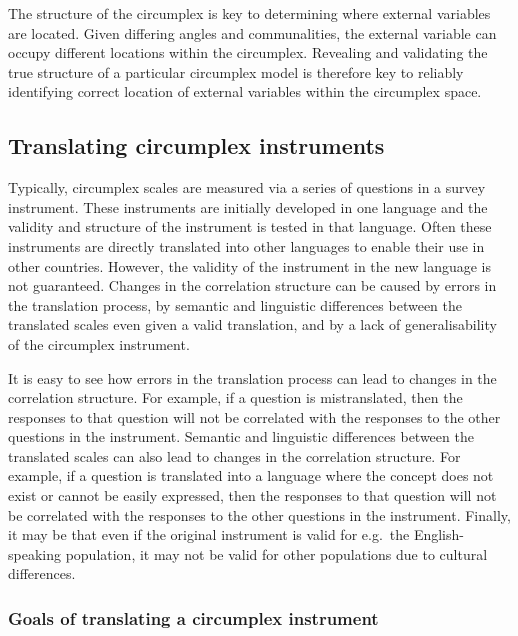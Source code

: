 \documentclass[
  authoryear,
  preprint,
  3p]{elsarticle}
\begin{document}
The structure of the circumplex is key to determining where external
variables are located. Given differing angles and communalities, the
external variable can occupy different locations within the circumplex.
Revealing and validating the true structure of a particular circumplex
model is therefore key to reliably identifying correct location of
external variables within the circumplex space.

\subsection{Translating circumplex
instruments}\label{translating-circumplex-instruments}

Typically, circumplex scales are measured via a series of questions in a
survey instrument. These instruments are initially developed in one
language and the validity and structure of the instrument is tested in
that language. Often these instruments are directly translated into
other languages to enable their use in other countries. However, the
validity of the instrument in the new language is not guaranteed.
Changes in the correlation structure can be caused by errors in the
translation process, by semantic and linguistic differences between the
translated scales even given a valid translation, and by a lack of
generalisability of the circumplex instrument.

It is easy to see how errors in the translation process can lead to
changes in the correlation structure. For example, if a question is
mistranslated, then the responses to that question will not be
correlated with the responses to the other questions in the instrument.
Semantic and linguistic differences between the translated scales can
also lead to changes in the correlation structure. For example, if a
question is translated into a language where the concept does not exist
or cannot be easily expressed, then the responses to that question will
not be correlated with the responses to the other questions in the
instrument. Finally, it may be that even if the original instrument is
valid for e.g.~the English-speaking population, it may not be valid for
other populations due to cultural differences.

\subsubsection{Goals of translating a circumplex
instrument}\label{goals-of-translating-a-circumplex-instrument}
\end{document}
